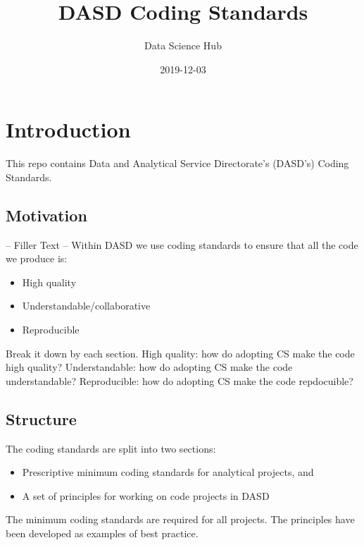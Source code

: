 \documentclass[]{book}
\title{DASD Coding Standards}
\author{Data Science Hub}
\date{2019-12-03}
\providecommand{\tightlist}{%
  \setlength{\itemsep}{0pt}\setlength{\parskip}{0pt}}
\begin{document}
\maketitle

{
\setcounter{tocdepth}{1}
\tableofcontents
}
\hypertarget{intro}{%
\chapter{Introduction}\label{intro}}

This repo contains Data and Analytical Service Directorate's (DASD's) Coding Standards.

\hypertarget{motivation}{%
\section{Motivation}\label{motivation}}

-- Filler Text --
Within DASD we use coding standards to ensure that all the code we produce is:

\begin{itemize}
\tightlist
\item
  High quality\\
\item
  Understandable/collaborative\\
\item
  Reproducible
\end{itemize}

Break it down by each section.
High quality: how do adopting CS make the code high quality?
Understandable: how do adopting CS make the code understandable?
Reproducible: how do adopting CS make the code repdocuible?

\hypertarget{structure}{%
\section{Structure}\label{structure}}

The coding standards are split into two sections:

\begin{itemize}
\tightlist
\item
  Prescriptive minimum coding standards for analytical projects, and
\item
  A set of principles for working on code projects in DASD
\end{itemize}

The minimum coding standards are required for all projects.
The principles have been developed as examples of best practice.
\end{document}
